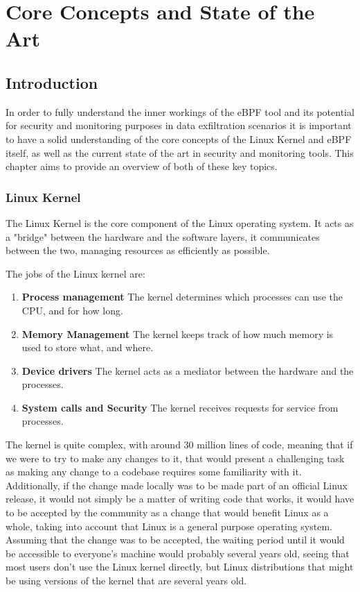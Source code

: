 \chapter{Core Concepts and State of the Art}

\section{Introduction}

In order to fully understand the inner workings of the eBPF tool and its potential for security and monitoring purposes in data exfiltration scenarios it is important to have a solid understanding of the core concepts of the Linux Kernel and eBPF itself, as well as the current state of the art in security and monitoring tools.
This chapter aims to provide an overview of both of these key topics.



\subsection{Linux Kernel}
The Linux Kernel is the core component of the Linux operating system. It acts as a "bridge" between the hardware and the software layers, it communicates between the two, managing resources as efficiently as possible. 

The jobs of the Linux kernel are:
\begin{enumerate}
    \item \textbf{Process management}
        The kernel determines which processes can use the CPU, and for how long.
    \item \textbf{Memory Management}
        The kernel keeps track of how much memory is used to store what, and where.
    \item \textbf{Device drivers}
        The kernel acts as a mediator between the hardware and the processes.
    \item \textbf{System calls and Security}
        The kernel receives requests for service from processes.
\end{enumerate}


The kernel is quite complex, with around 30 million lines of code, meaning that if we were to try to make any changes to it, that would present a challenging task as making any change to a codebase requires some familiarity with it. Additionally, if the change made locally was to be made part of an official Linux release, it would not simply be a matter of writing code that works, it would have to be accepted by the community as a change that would benefit Linux as a whole, taking into account that Linux is a general purpose operating system. Assuming that the change was to be accepted, the waiting period until it would be accessible to everyone's machine would probably several years old, seeing that most users don't use the Linux kernel directly, but Linux distributions that might be using versions of the kernel that are several years old.

